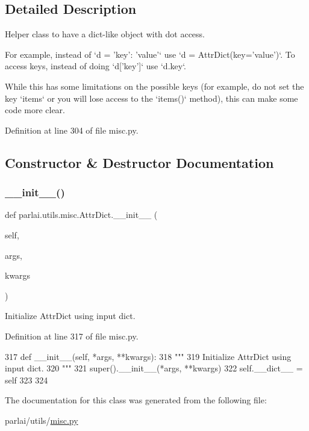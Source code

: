 \subsection{Detailed Description}
\begin{DoxyVerb}Helper class to have a dict-like object with dot access.

For example, instead of `d = {'key': 'value'}` use
`d = AttrDict(key='value')`.
To access keys, instead of doing `d['key']` use `d.key`.

While this has some limitations on the possible keys (for example, do not
set the key `items` or you will lose access to the `items()` method), this
can make some code more clear.
\end{DoxyVerb}
 

Definition at line 304 of file misc.\+py.



\subsection{Constructor \& Destructor Documentation}
\mbox{\label{classparlai_1_1utils_1_1misc_1_1AttrDict_a8a0ed33202adee184fc7ec06cf89a7ba}} 
\subsubsection{\texorpdfstring{\+\_\+\+\_\+init\+\_\+\+\_\+()}{\_\_init\_\_()}}
{\footnotesize\ttfamily def parlai.\+utils.\+misc.\+Attr\+Dict.\+\_\+\+\_\+init\+\_\+\+\_\+ (\begin{DoxyParamCaption}\item[{}]{self,  }\item[{}]{args,  }\item[{}]{kwargs }\end{DoxyParamCaption})}

\begin{DoxyVerb}Initialize AttrDict using input dict.
\end{DoxyVerb}
 

Definition at line 317 of file misc.\+py.


\begin{DoxyCode}
317     \textcolor{keyword}{def }\_\_init\_\_(self, *args, **kwargs):
318         \textcolor{stringliteral}{"""}
319 \textcolor{stringliteral}{        Initialize AttrDict using input dict.}
320 \textcolor{stringliteral}{        """}
321         super().\_\_init\_\_(*args, **kwargs)
322         self.\_\_dict\_\_ = self
323 
324 
\end{DoxyCode}


The documentation for this class was generated from the following file\+:\begin{DoxyCompactItemize}
\item 
parlai/utils/\hyperlink{misc_8py}{misc.\+py}\end{DoxyCompactItemize}
